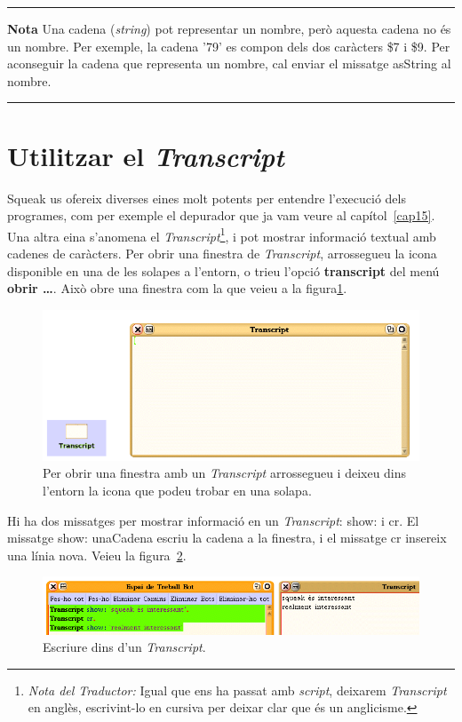 \noindent
\rule{\textwidth}{2pt}
\noindent
\textbf{Nota} Una cadena (\emph{string}) pot representar un nombre, però aquesta cadena no és un nombre. Per exemple, la cadena \textsf{'79'} es compon dels dos caràcters \textsf{\$7} i \textsf{\$9}. Per aconseguir la cadena que representa un nombre, cal enviar el missatge \textsf{asString} al nombre.\\
\noindent
\rule{\textwidth}{2pt}

\section{Utilitzar el \emph{Transcript}}
Squeak us ofereix diverses eines molt potents per entendre l'execució dels programes, com per exemple el depurador que ja vam veure al capítol~\ref{cap15}. Una altra eina s'anomena el \emph{Transcript}\footnote{\emph{Nota del Traductor:} Igual que ens ha passat amb \emph{script}, deixarem \emph{Transcript} en anglès, escrivint-lo en cursiva per deixar clar que és un anglicisme.}, i pot mostrar informació textual amb cadenes de caràcters. Per obrir una finestra de \emph{Transcript}, arrossegueu la icona disponible en una de les solapes a l'entorn, o trieu l'opció \textbf{transcript} del menú \textbf{obrir \dots}. Això obre una finestra com la que veieu a la figura\ref{fig1702}.
\begin{figure}[h!]
\begin{center}
\includegraphics[scale=2.5]{Imatges/figura17-2.png}
\end{center}
\caption{Per obrir una finestra amb un \emph{Transcript} arrossegueu i deixeu dins l'entorn la icona que podeu trobar en una solapa.}
\label{fig1702}
\end{figure}

Hi ha dos missatges per mostrar informació en un \emph{Transcript}: \textsf{show:} i \textsf{cr}. El missatge \textsf{show: unaCadena} escriu la cadena a la finestra, i el missatge \textsf{cr} insereix una línia nova. Veieu la figura~\ref{fig1703}.
\begin{figure}[h!]
\begin{center}
\includegraphics[scale=2.5]{Imatges/figura17-3.png}
\end{center}
\caption{Escriure dins d'un \emph{Transcript}.}
\label{fig1703}
\end{figure}

